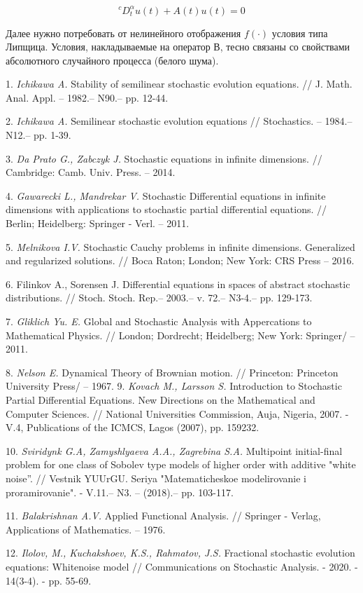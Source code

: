 $$^{c}D_{t}^{\alpha}u(t)+A(t)u(t)=0$$

Далее нужно потребовать от нелинейного отображения $f(\cdot)$ условия типа Липщица. Условия, накладываемые на оператор $В$, тесно связаны со свойствами абсолютного случайного процесса (белого шума).









\litlist

1.	{\it Ichikawa A.} Stability of semilinear stochastic evolution equations. // J. Math. Anal. Appl. – 1982.– N90.– pp. 12-44.

2.	{\it Ichikawa A.} Semilinear stochastic evolution equations // Stochastics. – 1984.– N12.– pp. 1-39.

3.	{\it Da Prato G., Zabczyk J.} Stochastic equations in infinite dimensions. // Cambridge: Camb. Univ. Press. – 2014.

4.	{\it Gawarecki L., Mandrekar V.} Stochastic Differential equations in infinite dimensions with applications to stochastic partial differential equations. // Berlin; Heidelberg: Springer - Verl. – 2011.

5.	{\it Melnikova I.V.} Stochastic Cauchy problems in infinite dimensions. Generalized and regularized solutions. // Boca Raton; London; New York: CRS Press – 2016.

6.	{Filinkov A., Sorensen J.}  Differential equations in spaces of abstract stochastic distributions. // Stoch. Stoch. Rep.– 2003.– v. 72.– N3-4.– pp. 129-173.

7.	{\it Gliklich Yu. E.} Global and Stochastic Analysis with Appercations to Mathematical Physics. // London; Dordrecht; Heidelberg; New York: Springer/ – 2011.

8.	{\it Nelson E.} Dynamical Theory of Brownian motion. // Princeton: Princeton University Press/ – 1967.
9.	{\it Kovach M., Larsson S.} Introduction to Stochastic Partial Differential Equations. New Directions on the Mathematical and Computer Sciences. // National Universities Commission, Auja, Nigeria, 2007. -V.4, Publications of the ICMCS, Lagos (2007), pp. 159232.

10.	{\it Sviridynk G.A, Zamyshlyaeva A.A., Zagrebina S.A.} Multipoint initial-final problem for one class of Sobolev type models of higher order with additive "white noise”. // Vestnik YUUrGU. Seriya "Matematicheskoe modelirovanie i proramirovanie". - V.11.– N3. – (2018).– pp. 103-117.

11.	{\it Balakrishnan A.V.} Applied Functional Analysis. // Springer - Verlag, Applications of Mathematics. – 1976.

12. {\it Ilolov, M., Kuchakshoev, K.S., Rahmatov, J.S.} Fractional stochastic evolution equations: Whitenoise model // Communications on Stochastic Analysis. - 2020. - 14(3-4). - pp. 55-69.



